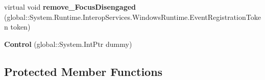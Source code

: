 \begin{DoxyCompactItemize}
\item 
\mbox{\label{class_windows_1_1_u_i_1_1_xaml_1_1_controls_1_1_control_a8242a4de1e17e601516c00e9e14f7415}} 
virtual void {\bfseries remove\+\_\+\+Focus\+Disengaged} (global\+::\+System.\+Runtime.\+Interop\+Services.\+Windows\+Runtime.\+Event\+Registration\+Token token)
\item 
\mbox{\label{class_windows_1_1_u_i_1_1_xaml_1_1_controls_1_1_control_ac6f409bd00a64ebd932806d0bd90b1cf}} 
{\bfseries Control} (global\+::\+System.\+Int\+Ptr dummy)
\end{DoxyCompactItemize}
\subsection*{Protected Member Functions}
